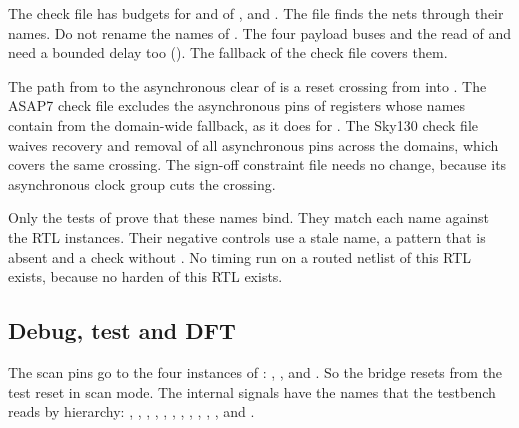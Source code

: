 The check file has budgets for  and  of ,  and . The file finds the nets through their names. Do not rename the names of . The four payload buses and the read of  and  need a bounded delay too (). The fallback of the check file covers them.

The path from  to the asynchronous clear of  is a reset crossing from  into . The ASAP7 check file excludes the asynchronous pins of registers whose names contain  from the domain-wide fallback, as it does for . The Sky130 check file waives recovery and removal of all asynchronous pins across the domains, which covers the same crossing. The sign-off constraint file needs no change, because its asynchronous clock group cuts the crossing.

Only the tests of  prove that these names bind. They match each name against the RTL instances. Their negative controls use a stale name, a pattern that is absent and a check without . No timing run on a routed netlist of this RTL exists, because no harden of this RTL exists.

\subsection{Debug, test and DFT}
The scan pins go to the four instances of : , ,  and . So the bridge resets from the test reset in scan mode. The internal signals have the names that the testbench reads by hierarchy: , , , , , , , , , , ,  and .

